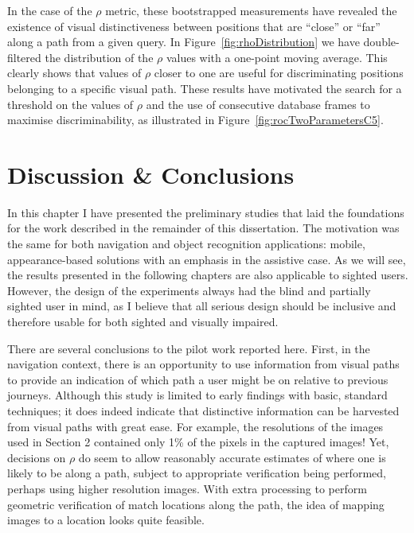 In the case of the $\rho$ metric, these bootstrapped measurements have revealed the existence of visual distinctiveness between positions that are ``close'' or ``far'' along a path from a given query. In Figure~\ref{fig:rhoDistribution} we have double-filtered the distribution of the $\rho$ values with a one-point moving average. This clearly shows that values of $\rho$ closer to one are useful for discriminating positions belonging to a specific visual path. These results have motivated the search for a threshold on the values of $\rho$ and the use of consecutive database frames to maximise discriminability, as illustrated in Figure~\ref{fig:rocTwoParametersC5}.




\section{Discussion \& Conclusions}

In this chapter I have presented the preliminary studies that laid the foundations for the work described in the remainder of this dissertation. The motivation was the same for both navigation and object recognition applications: mobile, appearance-based solutions with an emphasis in the assistive case. As we will see, the results presented in the following chapters are also applicable to sighted users. However, the design of the experiments always had the blind and partially sighted user in mind, as I believe that all serious design should be inclusive and therefore usable for both sighted and visually impaired. 

There are several conclusions to the pilot work reported here.  First, in the navigation context, there is an opportunity to use information from visual paths to provide an indication of which path a user might be on relative to previous journeys.  Although this study is limited to early findings with basic, standard techniques; it does indeed indicate that distinctive information can be harvested from visual paths with great ease.  For example, the resolutions of the images used in Section 2 contained only 1\% of the pixels in the captured images!  Yet, decisions on $\rho$ do seem to allow reasonably accurate estimates of where one is likely to be along a path, subject to appropriate verification being performed, perhaps using higher resolution images. With extra processing to perform geometric verification of match locations along the path, the idea of mapping images to a location looks quite feasible.

